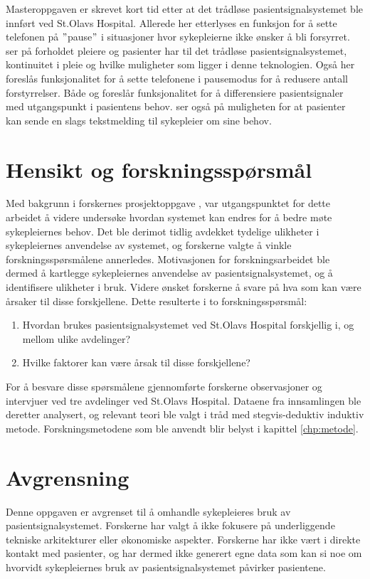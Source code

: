 \noindent
Masteroppgaven \citep{Sletten09} er skrevet kort tid etter at det trådløse pasientsignalsystemet ble innført ved St.Olavs Hospital. Allerede her etterlyses en funksjon for å sette telefonen på $"$pause$"$ i situasjoner hvor sykepleierne ikke ønsker å bli forsyrret. \citet{Rygh13} ser på forholdet pleiere og pasienter har til det trådløse pasientsignalsystemet, kontinuitet i pleie og hvilke muligheter som ligger i denne teknologien. Også her foreslås funksjonalitet for å sette telefonene i pausemodus for å redusere antall forstyrrelser. Både \citep{Rygh13} og \citep{Selseth12} foreslår funksjonalitet for å differensiere pasientsignaler med utgangspunkt i pasientens behov. \citet{Selseth12} ser også på muligheten for at pasienter kan sende en slags tekstmelding til sykepleier om sine behov.

\section{Hensikt og forskningsspørsmål}
Med bakgrunn i forskernes prosjektoppgave \citep{Sund13}, var utgangspunktet for dette arbeidet å videre undersøke hvordan systemet kan endres for å bedre møte sykepleiernes behov. Det ble derimot tidlig avdekket tydelige ulikheter i sykepleiernes anvendelse av systemet, og forskerne valgte å vinkle forskningsspørsmålene annerledes. Motivasjonen for forskningsarbeidet ble dermed å kartlegge sykepleiernes anvendelse av pasientsignalsystemet, og å identifisere ulikheter i bruk. Videre ønsket forskerne å svare på hva som kan være årsaker til disse forskjellene. Dette resulterte i to forskningsspørsmål:

\begin{enumerate}
\item Hvordan brukes pasientsignalsystemet ved St.Olavs Hospital forskjellig i, og mellom ulike avdelinger? 
\item Hvilke faktorer kan være årsak til disse forskjellene?
\end{enumerate}

\noindent
For å besvare disse spørsmålene gjennomførte forskerne observasjoner og intervjuer ved tre avdelinger ved St.Olavs Hospital. Dataene fra innsamlingen ble deretter analysert, og relevant teori ble valgt i tråd med stegvis-deduktiv induktiv metode. Forskningsmetodene som ble anvendt blir belyst i kapittel \ref{chp:metode}.

\section{Avgrensning}
Denne oppgaven er avgrenset til å omhandle sykepleieres bruk av pasientsignalsystemet. Forskerne har valgt å ikke fokusere på underliggende tekniske arkitekturer eller økonomiske aspekter. Forskerne har ikke vært i direkte kontakt med pasienter, og har dermed ikke generert egne data som kan si noe om hvorvidt sykepleiernes bruk av pasientsignalsystemet påvirker pasientene. 

